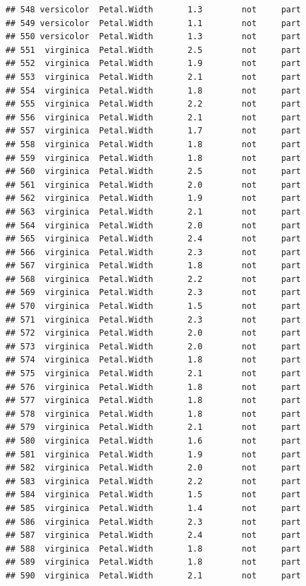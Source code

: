 \documentclass[krantz2]{krantz}\usepackage{knitr}%
\begin{document}
\begin{knitrout}
\begin{kframe}
\begin{verbatim}
## 548 versicolor  Petal.Width       1.3        not     part
## 549 versicolor  Petal.Width       1.1        not     part
## 550 versicolor  Petal.Width       1.3        not     part
## 551  virginica  Petal.Width       2.5        not     part
## 552  virginica  Petal.Width       1.9        not     part
## 553  virginica  Petal.Width       2.1        not     part
## 554  virginica  Petal.Width       1.8        not     part
## 555  virginica  Petal.Width       2.2        not     part
## 556  virginica  Petal.Width       2.1        not     part
## 557  virginica  Petal.Width       1.7        not     part
## 558  virginica  Petal.Width       1.8        not     part
## 559  virginica  Petal.Width       1.8        not     part
## 560  virginica  Petal.Width       2.5        not     part
## 561  virginica  Petal.Width       2.0        not     part
## 562  virginica  Petal.Width       1.9        not     part
## 563  virginica  Petal.Width       2.1        not     part
## 564  virginica  Petal.Width       2.0        not     part
## 565  virginica  Petal.Width       2.4        not     part
## 566  virginica  Petal.Width       2.3        not     part
## 567  virginica  Petal.Width       1.8        not     part
## 568  virginica  Petal.Width       2.2        not     part
## 569  virginica  Petal.Width       2.3        not     part
## 570  virginica  Petal.Width       1.5        not     part
## 571  virginica  Petal.Width       2.3        not     part
## 572  virginica  Petal.Width       2.0        not     part
## 573  virginica  Petal.Width       2.0        not     part
## 574  virginica  Petal.Width       1.8        not     part
## 575  virginica  Petal.Width       2.1        not     part
## 576  virginica  Petal.Width       1.8        not     part
## 577  virginica  Petal.Width       1.8        not     part
## 578  virginica  Petal.Width       1.8        not     part
## 579  virginica  Petal.Width       2.1        not     part
## 580  virginica  Petal.Width       1.6        not     part
## 581  virginica  Petal.Width       1.9        not     part
## 582  virginica  Petal.Width       2.0        not     part
## 583  virginica  Petal.Width       2.2        not     part
## 584  virginica  Petal.Width       1.5        not     part
## 585  virginica  Petal.Width       1.4        not     part
## 586  virginica  Petal.Width       2.3        not     part
## 587  virginica  Petal.Width       2.4        not     part
## 588  virginica  Petal.Width       1.8        not     part
## 589  virginica  Petal.Width       1.8        not     part
## 590  virginica  Petal.Width       2.1        not     part

\end{verbatim}
\end{kframe}
\end{knitrout}
\end{document}
